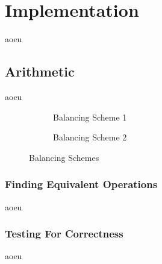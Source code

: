 \section{Implementation}
\label{implementation}
aoeu

\subsection{Arithmetic}
aoeu

\begin{figure}[h]
  \centering
  \begin{subfigure}{.49\linewidth}
    \centering
    \caption{Balancing Scheme 1}
    \label{fig:scheme1}
  \end{subfigure}
  \begin{subfigure}{0.49\linewidth}
    \centering
    \caption{Balancing Scheme 2}
  \end{subfigure}
  \caption{Balancing Schemes}
  \label{fig:schemes}
\end{figure}

\subsubsection{Finding Equivalent Operations}
\label{operations}
aoeu

\subsubsection{Testing For Correctness}
aoeu






